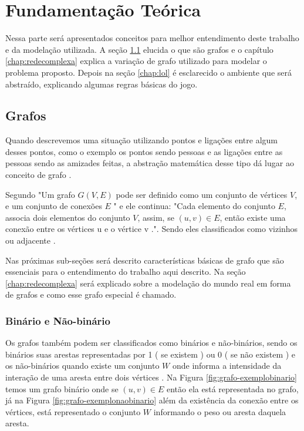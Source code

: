 \chapter{Fundamentação Teórica}
\label{chap:fundteorica}
Nessa parte será apresentados conceitos para melhor entendimento deste trabalho e da modelação utilizada. 
A seção \ref{chap:grafos} elucida o que são grafos e o capítulo \ref{chap:redecomplexa} explica a variação de grafo utilizado para modelar o problema proposto. Depois na seção \ref{chap:lol} é esclarecido o ambiente que será abstraído, explicando algumas regras básicas do jogo.
\section{Grafos}
\label{chap:grafos}

Quando descrevemos uma situação utilizando pontos e ligações entre algum desses pontos, como o exemplo os pontos sendo pessoas e as ligações entre as pessoas sendo as amizades feitas, a abstração matemática desse tipo dá lugar ao conceito de grafo \cite{Lucchesi1979}.

Segundo \citet{Viana2007} "Um grafo \(G(V, E)\) pode ser definido como um conjunto de vértices \(V\), e um conjunto de conexões \(E\) " e ele continua: "Cada elemento do conjunto \(E\), associa dois elementos do conjunto \(V\), assim, se \((u,v) \in E\), então existe uma conexão entre os vértices u e o vértice v .". Sendo eles classificados como vizinhos ou adjacente \cite{grafosucinto}.

Nas próximas sub-seções será descrito características básicas de grafo que são essenciais para o entendimento do trabalho aqui descrito. Na seção \ref{chap:redecomplexa} será explicado sobre a modelação do mundo real em forma de grafos e como esse grafo especial é chamado.


\subsection{Binário e Não-binário}
Os grafos também podem ser classificados como binários e não-binários, sendo os binários suas arestas representadas por 1 ( se existem ) ou 0 ( se não existem ) e os não-binários quando existe um conjunto \(W\) onde informa a intensidade da interação de uma aresta entre dois vértices  \cite{Viana2007}.
Na Figura \ref{fig:grafo-exemplobinario} temos um grafo binário onde se \((u,v) \in E\) então ela está representada no grafo, já na Figura \ref{fig:grafo-exemplonaobinario} além da existência da conexão entre os vértices, está representado o conjunto \(W\) informando o peso ou aresta daquela aresta.

